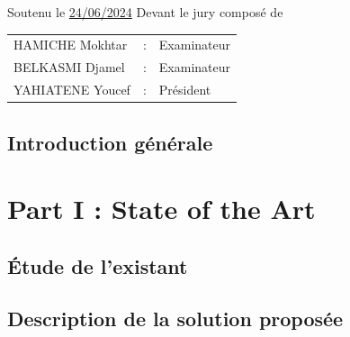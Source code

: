 \documentclass[12pt,a4paper]{report}
\begin{document}
\begin{titlepage}
\begin{center}
    {\normalsize Soutenu le \underline{24/06/2024} Devant le jury composé de} \\
    \vspace{0.4cm}
    \begin{tabular}{lll}
        HAMICHE Mokhtar & : & Examinateur \\
        BELKASMI Djamel & : & Examinateur \\
        YAHIATENE Youcef & : & Président \\
    \end{tabular}
\end{center}
\end{titlepage}





\tableofcontents
\listoffigures

\chapter*{Introduction générale}



\cleardoublepage
\part*{Part I : State of the Art}
\thispagestyle{empty}

\chapter{Étude de l'existant}


\chapter{Description de la solution proposée}



\cleardoublepage
\end{document}
